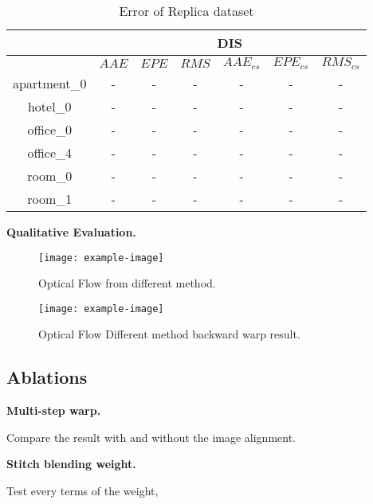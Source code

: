 

\begin{table}[h!]
	\centering
	\begin{tabular}{ c | c | c | c | c | c | c }
		\hline
		& \multicolumn{6}{c}{DIS}  \\
		\hline
		& ${AAE}$ & ${EPE}$ & ${RMS}$ & ${AAE_{cs}}$ & ${EPE_{cs}}$ & ${RMS_{cs}}$ \\
		\hline
		apartment\_0 & - & - & -  & - & - & -  \\ 
		\hline
		hotel\_0 & - & - & -  & - & - & -  \\ 
		\hline
		office\_0 & - & - & - & - & - & -  \\ 
		\hline
		office\_4 & - & - & -  & - & - & -  \\ 
		\hline
		room\_0 & - & - & - & - & - & -  \\ 
		\hline
		room\_1 & - & - & -  & - & - & -  \\ 
		\hline\hline
	\end{tabular}
	\caption{Error of Replica dataset}
	\label{fig:exp:quality}
\end{table}




\textbf{Qualitative Evaluation.}

\begin{figure}[hbt!]
	\centering
	\texttt{[image: example-image]}
	\caption{Optical Flow from different method.}
	\label{fig:exp:compflow}
\end{figure}

\begin{figure}[hbt!]
	\centering
	\texttt{[image: example-image]}
	\caption{Optical Flow Different method backward warp result.}
	\label{fig:exp:backwardwarp}
\end{figure}


\subsection{Ablations}

\textbf{Multi-step warp.}

Compare the result with and without the image alignment.

\textbf{Stitch blending weight.}

Test every terms of the weight,
